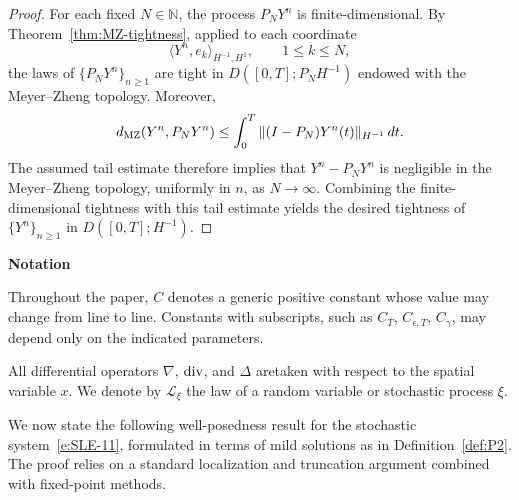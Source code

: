 \documentclass[11pt]{article}
\theoremstyle{plain}
\numberwithin{equation}{section}
\begin{document}
\begin{proof}
For each fixed \(N\in\mathbb N\), the process \(P_NY^n\) is
finite-dimensional. By Theorem~\ref{thm:MZ-tightness}, applied to each
coordinate
\[
\langle Y^n,e_k\rangle_{H^{-1},H^1},\qquad 1\le k\le N,
\]
the laws of \(\{P_NY^n\}_{n\ge1}\) are tight in \(D([0,T];P_NH^{-1})\) endowed with the Meyer--Zheng topology.
Moreover,
\[
d_{\rm MZ}(Y^n,P_NY^n)\le\int_0^T\|(I-P_N)Y^n(t)\|_{H^{-1}}\,dt .
\]
The assumed tail estimate therefore implies that \(Y^n-P_NY^n\) is negligible in the Meyer--Zheng topology, uniformly in \(n\), as
\(N\to\infty\). Combining the finite-dimensional tightness with this tail estimate yields the desired tightness of \(\{Y^n\}_{n\ge1}\) in
\(D([0,T];H^{-1})\).
\end{proof}

 

 


\textbf{Notation}

Throughout the paper, \(C\) denotes a generic positive constant whose value
may change from line to line. Constants with subscripts, such as
\(C_T\), \(C_{\epsilon,T}\), \(C_\gamma\), may depend only on the indicated
parameters.

All differential operators \(\nabla\), \({\rm div}\), and \(\Delta\) aretaken with respect to the spatial variable \(x\). We denote by
\(\mathcal L_\xi\) the law of a random variable or stochastic process \(\xi\).




 
 
 
We now state the following well-posedness result for the stochastic system~\eqref{e:SLE-11}, formulated in terms of mild solutions as in Definition~\ref{def:P2}. The proof relies on a standard localization and truncation argument combined with fixed-point methods.
\end{document}

